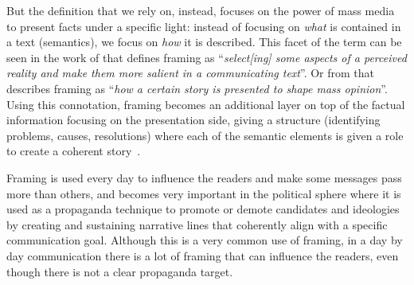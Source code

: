 But the definition that we rely on, instead, focuses on the power of mass media to present facts under a specific light: instead of focusing on \emph{what} is contained in a text (semantics), we focus on \emph{how} it is described.
This facet of the term can be seen in the work of
\citet{entman1993framing} that defines framing as ``\textit{select[ing] some aspects of a perceived reality and make them more salient in a communicating text}''.
Or from \citet{goffman1974frame} that describes framing as ``\textit{how a certain story is presented to shape mass opinion}''.
Using this connotation, framing becomes an additional layer on top of the factual information focusing on the presentation side, giving a structure (identifying problems, causes, resolutions) where each of the semantic elements is given a role to create a coherent story~\cite{pan1993framing}.

Framing is used every day to influence the readers and make some messages pass more than others, and becomes very important in the political sphere where it is used as a propaganda technique to promote or demote candidates and ideologies by creating and sustaining narrative lines that coherently align with a specific communication goal.
Although this is a very common use of framing, in a day by day communication there is a lot of framing that can influence the readers, even though there is not a clear propaganda target.



